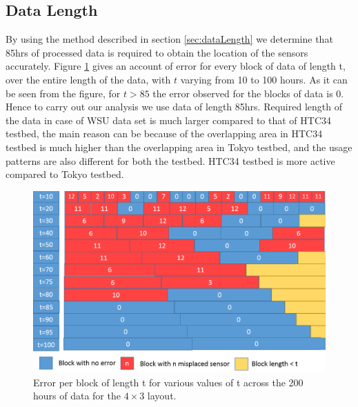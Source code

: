 \subsection{Data Length}
By using the method described in section \ref{sec:dataLength} we determine that 85hrs of processed data is required to obtain the location of the sensors accurately.  Figure \ref{fig:evst} gives an account of error for every block of data of length t, over the entire length of the data, with $t$ varying from 10 to 100 hours.
As it can be seen from the figure, for $t>85$ the error observed for the blocks of data is 0. Hence to carry out our analysis we use data of length 85hrs. Required length of the data in case of WSU data set is much larger compared to that of HTC34 testbed, the main reason can be because of the overlapping area in HTC34 testbed is much higher than the overlapping area in Tokyo testbed, and the usage patterns are also different for both the testbed. HTC34 testbed is more active compared to Tokyo testbed.
\begin{figure}[!ht]
\includegraphics[scale=0.25]{./pics/errorvstime.png}
\caption{Error per block of length t for various values of t across the 200 hours of data for the $4 \times 3$ layout.}
\label{fig:evst}
\centering
\end{figure}


